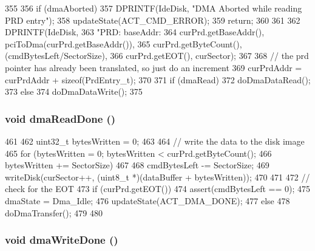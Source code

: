 \begin{DoxyCode}
355 {
356     if (dmaAborted) {
357         DPRINTF(IdeDisk, "DMA Aborted while reading PRD entry\n");
358         updateState(ACT_CMD_ERROR);
359         return;
360     }
361 
362     DPRINTF(IdeDisk,
363             "PRD: baseAddr:%
364             curPrd.getBaseAddr(), pciToDma(curPrd.getBaseAddr()),
365             curPrd.getByteCount(), (cmdBytesLeft/SectorSize),
366             curPrd.getEOT(), curSector);
367 
368     // the prd pointer has already been translated, so just do an increment
369     curPrdAddr = curPrdAddr + sizeof(PrdEntry_t);
370 
371     if (dmaRead)
372         doDmaDataRead();
373     else
374         doDmaDataWrite();
375 }
\end{DoxyCode}
\hypertarget{classIdeDisk_a2854a0676c5ef05d69512cabd994959c}{
\subsubsection[{dmaReadDone}]{\setlength{\rightskip}{0pt plus 5cm}void dmaReadDone ()}}
\label{classIdeDisk_a2854a0676c5ef05d69512cabd994959c}



\begin{DoxyCode}
461 {
462     uint32_t bytesWritten = 0;
463 
464     // write the data to the disk image
465     for (bytesWritten = 0; bytesWritten < curPrd.getByteCount();
466          bytesWritten += SectorSize) {
467 
468         cmdBytesLeft -= SectorSize;
469         writeDisk(curSector++, (uint8_t *)(dataBuffer + bytesWritten));
470     }
471 
472     // check for the EOT
473     if (curPrd.getEOT()) {
474         assert(cmdBytesLeft == 0);
475         dmaState = Dma_Idle;
476         updateState(ACT_DMA_DONE);
477     } else {
478         doDmaTransfer();
479     }
480 }
\end{DoxyCode}
\hypertarget{classIdeDisk_a830e4a686d005a80a9fbf09c5d6d493e}{
\subsubsection[{dmaWriteDone}]{\setlength{\rightskip}{0pt plus 5cm}void dmaWriteDone ()}}
\label{classIdeDisk_a830e4a686d005a80a9fbf09c5d6d493e}



